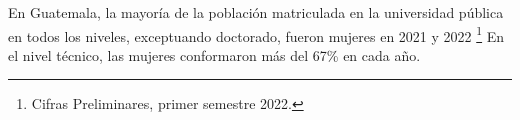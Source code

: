 En Guatemala, la mayoría de la población matriculada en la universidad pública en todos los niveles, exceptuando doctorado, fueron mujeres en 2021 y 2022 \footnote{Cifras Preliminares, primer semestre 2022.} En el nivel técnico, las mujeres conformaron más del 67\% en cada año. 